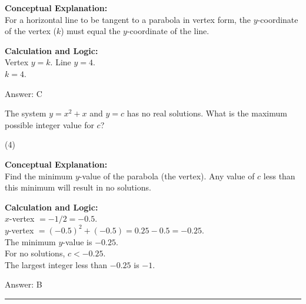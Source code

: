 \documentclass[11pt,paper=a4,answers]{exam}
\begin{document}
\begin{questions}
\begin{solution}
\textbf{Conceptual Explanation:} \\
For a horizontal line to be tangent to a parabola in vertex form, the $y$-coordinate of the vertex ($k$) must equal the $y$-coordinate of the line.

\vspace{20pt}

\textbf{Calculation and Logic:} \\
Vertex $y = k$. Line $y = 4$. \\
$k = 4$.

\vspace{25pt}

Answer: \colorbox{yellow!100}{C}
\end{solution}

\vspace{40pt}

\question
The system $y = x^2 + x$ and $y = c$ has no real solutions. What is the maximum possible integer value for $c$?
\begin{tasks}(4)
\end{tasks}

\begin{solution}
\textbf{Conceptual Explanation:} \\
Find the minimum $y$-value of the parabola (the vertex). Any value of $c$ less than this minimum will result in no solutions.

\vspace{20pt}

\textbf{Calculation and Logic:} \\
$x$-vertex $= -1/2 = -0.5$. \\
$y$-vertex $= (-0.5)^2 + (-0.5) = 0.25 - 0.5 = -0.25$. \\
The minimum $y$-value is $-0.25$. \\
For no solutions, $c < -0.25$. \\
The largest integer less than $-0.25$ is $-1$.

\vspace{25pt}

Answer: \colorbox{yellow!100}{B}
\end{solution}


\end{questions}
\begin{center}
\rule{.5\textwidth}{1pt}
\end{center}
\end{document}
